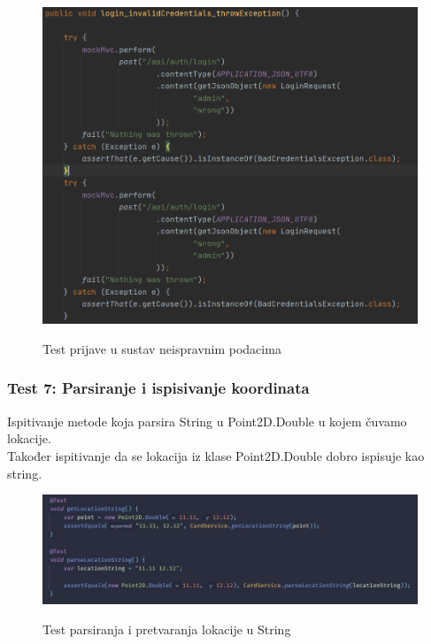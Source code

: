 			\begin{figure}[H]
				\centering
				\includegraphics[scale=0.75]{slike/test6} \\
				\caption{ Test prijave u sustav neispravnim podacima}
				\label{fig:test6}
			\end{figure}
		
			\eject
		
			\subsubsection{Test 7: Parsiranje i ispisivanje koordinata}
			Ispitivanje metode koja parsira String u Point2D.Double u kojem čuvamo lokacije. \\
			Također ispitivanje da se lokacija iz klase Point2D.Double dobro ispisuje kao string.
		
			\begin{figure}[H]
				\centering
				\includegraphics[scale=0.65]{slike/test7} \\
				\caption{ Test parsiranja i pretvaranja lokacije u String }
				\label{fig:test7}
			\end{figure}
		
